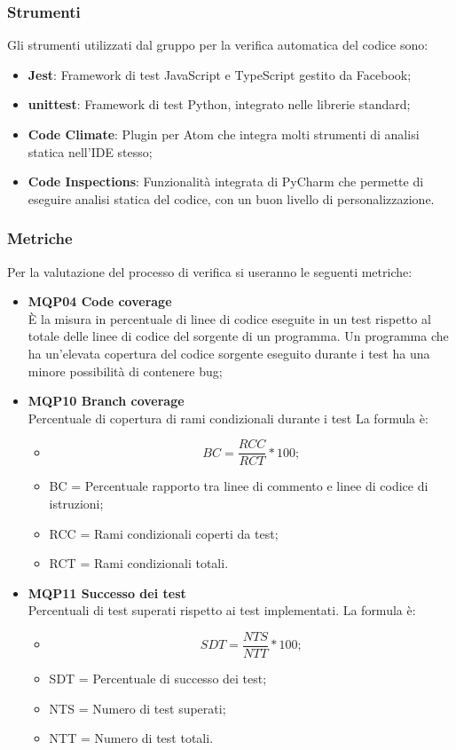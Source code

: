 \subsubsection{Strumenti}
Gli strumenti utilizzati dal gruppo per la verifica automatica del codice sono:
\begin{itemize}
\item \textbf{Jest}: Framework di test JavaScript e TypeScript gestito da Facebook;
\item \textbf{unittest}: Framework di test Python, integrato nelle librerie standard;
\item \textbf{Code Climate}: Plugin per Atom che integra molti strumenti di analisi statica nell'IDE stesso;
\item \textbf{Code Inspections}: Funzionalità integrata di PyCharm che permette di eseguire analisi statica del codice, con un buon livello di personalizzazione. 
\end{itemize}

\subsubsection{Metriche}
Per la valutazione del processo di verifica si useranno le seguenti metriche:
\begin{itemize}
\item \textbf{MQP04 Code coverage} \\ È la misura in percentuale di linee di codice eseguite in un test rispetto al totale delle linee di codice del sorgente di un programma. Un programma che ha un’elevata copertura del codice sorgente eseguito durante i test ha una minore possibilità di contenere bug;
\item \textbf{MQP10 Branch coverage} \\
Percentuale di copertura di rami condizionali durante i test
La formula è:
\begin{itemize}
  \item[] \[BC = \frac{RCC}{RCT} * 100 ;\]
  \item BC = Percentuale rapporto tra linee di commento e linee di codice di istruzioni;
  \item RCC = Rami condizionali coperti da test;
  \item RCT = Rami condizionali totali.
  \end{itemize}
\item \textbf{MQP11 Successo dei test}\\
Percentuali di test superati rispetto ai test implementati.
La formula è:
\begin{itemize}
  \item[] \[SDT = \frac{NTS}{NTT} * 100 ;\]
  \item SDT = Percentuale di successo dei test;
  \item NTS = Numero di test superati;
  \item NTT = Numero di test totali.
  \end{itemize}
\end{itemize}


